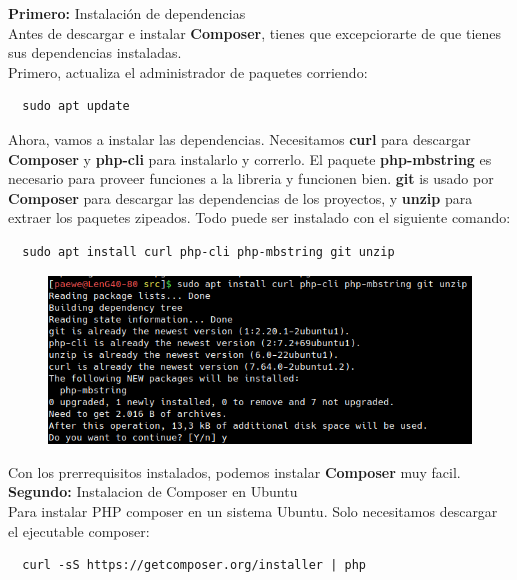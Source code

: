 \documentclass{article}
\begin{document}
\textbf{Primero:} Instalación de dependencias\\
Antes de descargar e instalar \textbf{Composer}, tienes que excepciorarte de
que tienes sus dependencias instaladas.\\
Primero, actualiza el administrador de paquetes corriendo:\\

\begin{verbatim}
  sudo apt update
\end{verbatim}

Ahora, vamos a instalar las dependencias. Necesitamos \textbf{curl} para
descargar \textbf{Composer} y \textbf{php-cli} para instalarlo y correrlo. El
paquete \textbf{php-mbstring} es necesario para proveer funciones a la libreria
y funcionen bien. \textbf{git} is usado por \textbf{Composer} para descargar
las dependencias de los proyectos, y \textbf{unzip} para extraer los paquetes
zipeados. Todo puede ser instalado con el siguiente comando:\\

\begin{verbatim}
  sudo apt install curl php-cli php-mbstring git unzip
\end{verbatim}

\begin{figure}[h!]
  \centering
  \includegraphics[scale=0.75]{./Pictures/055_composer.png}
\end{figure}

Con los prerrequisitos instalados, podemos instalar \textbf{Composer} muy
facil.\\

\textbf{Segundo:} Instalacion de Composer en Ubuntu\\
Para instalar PHP composer en un sistema Ubuntu. Solo necesitamos descargar el
ejecutable composer:\\

\begin{verbatim}
  curl -sS https://getcomposer.org/installer | php
\end{verbatim}
\end{document}

